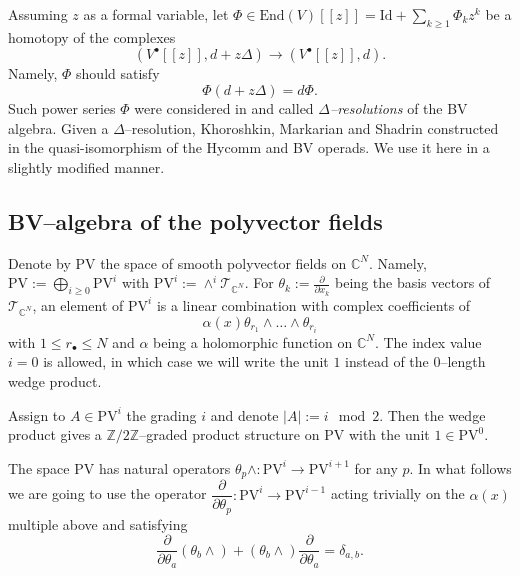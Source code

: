 \documentclass[12pt,a4paper]{amsart}
\newcommand{\CC}{{\mathbb{C}}}
\def\T{{\mathcal T}}
\newcommand{\p}{{\partial}}
\newcommand{\<}{\left<}
\renewcommand{\>}{\right>}
\newcommand{\Id}{\mathrm{Id}}
\newcommand{\ZZ}{\mathbb{Z}}
\newcommand{\PV}{{\mathrm{PV}}}
\numberwithin{equation}{section}
\begin{document}
Assuming $z$ as a formal variable, let $\Phi \in \mathrm{End}(V)[[z]] = \Id + \sum_{k \ge 1} \Phi_k z^k$ be a homotopy of the complexes
\[
    (V^\bullet[[z]], d + z \Delta) \to (V^\bullet[[z]], d).
\]
Namely, $\Phi$ should satisfy
\begin{equation}\label{eq: BV operator trivialization}
    \Phi (d + z \Delta) = d \Phi.
\end{equation}
Such power series $\Phi$ were considered in \cite{KMS} and called \textit{$\Delta$--resolutions} of the BV algebra. Given a $\Delta$--resolution, Khoroshkin, Markarian and Shadrin constructed in \cite{KMS} the quasi-isomorphism of the Hycomm and BV operads. We use it here in a slightly modified manner.

\subsection{BV--algebra of the polyvector fields}\label{section: BV algebra}
Denote by $\PV$ the space of smooth polyvector fields on $\CC^N$. Namely, $\PV:= \bigoplus_{i \ge 0} \PV^{i}$ with $\PV^{i} := \wedge^i \T_{\CC^N}$. For $\theta_k := \frac{\p}{\p x_k}$ being the basis vectors of $\T_{\CC^N}$, an element of $\PV^{i}$ is a linear combination with complex coefficients of
\[
    \alpha(x) \theta_{r_1} \wedge \dots \wedge \theta_{r_i}
\]
with $1 \le r_\bullet \le N$ and $\alpha$ being a holomorphic function on $\CC^N$. The index value $i=0$ is allowed, in which case we will write the unit $1$ instead of the $0$--length wedge product.

Assign to $A \in  \PV^{i}$ the grading $i$ and denote $|A|:= i \mod 2$. Then the wedge product gives a $\ZZ/2\ZZ$--graded product structure on $\PV$ with the unit $1 \in \PV^{0}$.

The space $\PV$ has natural operators $ \theta_p \wedge: \PV^{i} \to \PV^{i+1}$  for any $p$. In what follows we are going to use the operator $\dfrac{\p}{\p \theta_p}: \PV^{i} \to \PV^{i-1}$ acting trivially on the $\alpha(x)$ multiple above and satisfying
\[
    \frac{\p}{\p \theta_a} (\theta_b\wedge) + (\theta_b\wedge) \frac{\p}{\p \theta_a} = \delta_{a,b}.
\]
%
\end{document}
